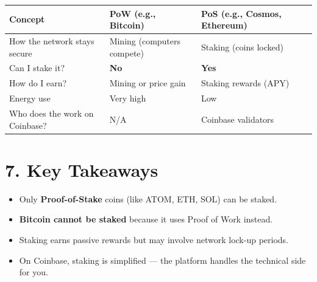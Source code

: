 \documentclass{article}
\begin{document}
\begin{center}
\begin{tabular}{@{}llll@{}}
\toprule
\textbf{Concept} & \textbf{PoW (e.g., Bitcoin)} & \textbf{PoS (e.g., Cosmos, Ethereum)} \\
\midrule
How the network stays secure & Mining (computers compete) & Staking (coins locked) \\
Can I stake it? & \textbf{No} & \textbf{Yes} \\
How do I earn? & Mining or price gain & Staking rewards (APY) \\
Energy use & Very high & Low \\
Who does the work on Coinbase? & N/A & Coinbase validators \\
\bottomrule
\end{tabular}
\end{center}

\bigskip

\section*{7. Key Takeaways}
\begin{itemize}
  \item Only \textbf{Proof-of-Stake} coins (like ATOM, ETH, SOL) can be staked.
  \item \textbf{Bitcoin cannot be staked} because it uses Proof of Work instead.
  \item Staking earns passive rewards but may involve network lock-up periods.
  \item On Coinbase, staking is simplified --- the platform handles the technical side for you.
\end{itemize}
\end{document}
